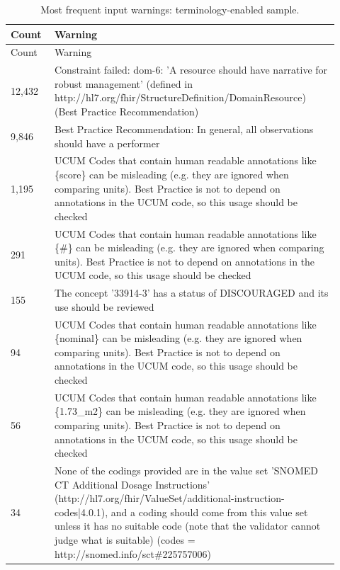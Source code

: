 {\small\setlength{\tabcolsep}{3pt}
\begin{longtable}{p{0.12\linewidth}p{0.8\linewidth}}
\caption{Most frequent input warnings: terminology-enabled sample.}\label{sup:warningsinputterminology}\\
\hline
Count & Warning \\ \hline
\endfirsthead
\hline
Count & Warning \\ \hline
\endhead
12,432 & Constraint failed:\allowbreak{} dom-\allowbreak{}6:\allowbreak{} 'A resource should have narrative for robust management' (defined in http:\allowbreak{}/\allowbreak{}/\allowbreak{}hl7.\allowbreak{}org/\allowbreak{}fhir/\allowbreak{}StructureDefinition/\allowbreak{}DomainResource) (Best Practice Recommendation) \\
9,846 & Best Practice Recommendation:\allowbreak{} In general, all observations should have a performer \\
1,195 & UCUM Codes that contain human readable annotations like \{score\} can be misleading (e.\allowbreak{}g.\allowbreak{} they are ignored when comparing units).\allowbreak{} Best Practice is not to depend on annotations in the UCUM code, so this usage should be checked \\
291 & UCUM Codes that contain human readable annotations like \{\#\} can be misleading (e.\allowbreak{}g.\allowbreak{} they are ignored when comparing units).\allowbreak{} Best Practice is not to depend on annotations in the UCUM code, so this usage should be checked \\
155 & The concept '33914-\allowbreak{}3' has a status of DISCOURAGED and its use should be reviewed \\
94 & UCUM Codes that contain human readable annotations like \{nominal\} can be misleading (e.\allowbreak{}g.\allowbreak{} they are ignored when comparing units).\allowbreak{} Best Practice is not to depend on annotations in the UCUM code, so this usage should be checked \\
56 & UCUM Codes that contain human readable annotations like \{1.\allowbreak{}73\_\allowbreak{}m2\} can be misleading (e.\allowbreak{}g.\allowbreak{} they are ignored when comparing units).\allowbreak{} Best Practice is not to depend on annotations in the UCUM code, so this usage should be checked \\
34 & None of the codings provided are in the value set 'SNOMED CT Additional Dosage Instructions' (http:\allowbreak{}/\allowbreak{}/\allowbreak{}hl7.\allowbreak{}org/\allowbreak{}fhir/\allowbreak{}ValueSet/\allowbreak{}additional-\allowbreak{}instruction-\allowbreak{}codes|4.\allowbreak{}0.\allowbreak{}1), and a coding should come from this value set unless it has no suitable code (note that the validator cannot judge what is suitable) (codes = http:\allowbreak{}/\allowbreak{}/\allowbreak{}snomed.\allowbreak{}info/\allowbreak{}sct\#225757006) \\

\end{longtable}}
